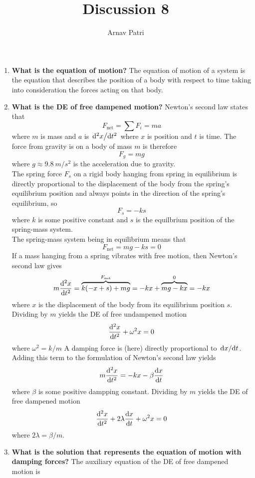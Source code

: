 \documentclass[12pt]{article}
\title{Discussion 8}
\author{Arnav Patri}
\newcommand{\subt}[2]{#1_{\text{#2}}}
\begin{document}
  \maketitle
  \begin{enumerate}
    \item \textbf{What is the equation of motion?}
      The equation of motion of a system is the equation that describes the position of a body with respect to time taking into consideration the forces acting on that body.
    \item \textbf{What is the DE of free dampened motion?}
      Newton's second law states that
        \[\subt{F}{net} = \sum F_i = ma\]
      where \(m\) is mass and \(a\) is \(\dv*[2]{x}{t}\) where \(x\) is position and \(t\) is time. The force from gravity is on a body of mass \(m\) is therefore
        \[F_g = mg\]
        where \(g \approx \SI{9.8}{m/s^2}\) is the acceleration due to gravity. \\
      The spring force \(F_s\) on a rigid body hanging from spring in equilibrium is directly proportional to the displacement of the body from the spring's equilibrium position and always points in the direction of the spring's equilibrium, so
        \[F_s = -ks\]
        where \(k\) is some positive constant and \(s\) is the equilbrium position of the spring-mass system. \\
      The spring-mass system being in equilibrium means that 
        \[\subt{F}{net} = mg - ks = 0\]
      If a mass hanging from a spring vibrates with free motion, then Newton's second law gives
        \[
            m\dv[2]{x}{t} = \overset{\subt{F}{net}}{\overbrace{k(-x + s) + mg}} 
              = -kx + \overset{0}{\overbrace{mg - kx}} = -kx
        \]
        where \(x\) is the displacement of the body from its equilibrium position \(s\). Dividing by \(m\) yields the DE of free undampened motion
        \[\dv[2]{x}{t} + \omega^2 x = 0\]
        where \(\omega^2 = k / m\)
      A damping force is (here) directly proportional to \(\dv*{x}{t}\). Adding this term to the formulation of Newton's second law yields
        \[m\dv[2]{x}{t} = -kx - \beta \dv{x}{t}\]
        where \(\beta\) is some positive dampping constant. Dividing by \(m\) yields the DE of free dampened motion
        \[\dv[2]{x}{t} + 2\lambda\dv{x}{t} + \omega^2 x = 0\]
        where \(2\lambda = \beta / m\).
    \item  \textbf{What is the solution that represents the equation of motion with damping forces?}
      The auxiliary equation of the DE of free dampened motion is

\end{enumerate}
\end{document}
